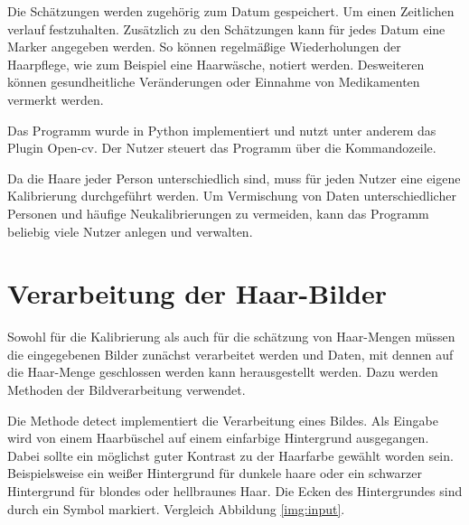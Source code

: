 \documentclass[german,a4paper,12pt]{llncs}
\begin{document}
Die Schätzungen werden zugehörig zum Datum gespeichert. Um einen Zeitlichen verlauf festzuhalten.
Zusätzlich zu den Schätzungen kann für jedes Datum eine Marker angegeben werden. So können regelmäßige Wiederholungen der Haarpflege, wie zum Beispiel eine Haarwäsche, notiert werden. Desweiteren können gesundheitliche Veränderungen oder Einnahme von Medikamenten vermerkt werden.

Das Programm wurde in Python implementiert und nutzt unter anderem das Plugin Open-cv.
Der Nutzer steuert das Programm über die Kommandozeile. 

Da die Haare jeder Person unterschiedlich sind, muss für jeden Nutzer eine eigene Kalibrierung durchgeführt werden. Um Vermischung von Daten unterschiedlicher Personen und häufige Neukalibrierungen zu vermeiden, kann das Programm beliebig viele Nutzer anlegen und verwalten. 

\section{Verarbeitung der Haar-Bilder}

Sowohl für die Kalibrierung als auch für die schätzung von Haar-Mengen müssen die eingegebenen Bilder zunächst verarbeitet werden und Daten, mit dennen auf die Haar-Menge geschlossen werden kann herausgestellt werden. Dazu werden Methoden der Bildverarbeitung verwendet.

Die Methode detect implementiert die Verarbeitung eines Bildes.
Als Eingabe wird von einem Haarbüschel auf einem einfarbige Hintergrund ausgegangen. Dabei sollte ein möglichst guter Kontrast zu der Haarfarbe gewählt worden sein. Beispielsweise ein weißer Hintergrund für dunkele haare oder ein schwarzer Hintergrund für blondes oder hellbraunes Haar. Die Ecken des Hintergrundes sind durch ein Symbol markiert. Vergleich Abbildung \ref{img:input}.
\end{document}
